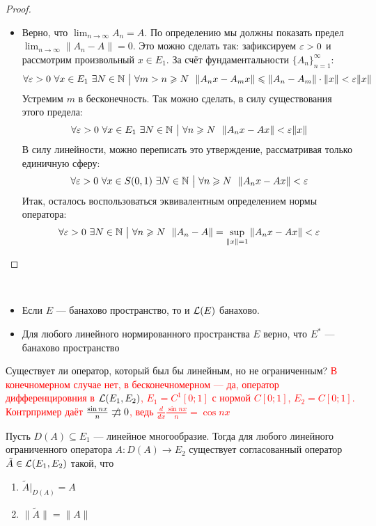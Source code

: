 \begin{proof}
\begin{enumerate}
\begin{itemize}
			\item Верно, что $\lim_{n \to \infty} A_n = A$. По определению мы должны показать предел \\ $\lim_{n \to \infty} \|A_n - A\| = 0$. Это можно сделать так: зафиксируем $\varepsilon > 0$ и рассмотрим произвольный $x \in E_1$. За счёт фундаментальности $\{A_n\}_{n = 1}^\infty$:
			\[
				\forall \eps > 0\ \forall x \in E_1\ \exists N \in \N \such \forall m > n \ge N\ \ \|A_nx - A_mx\| \le \|A_n - A_m\| \cdot \|x\| < \eps\|x\|
			\]
			Устремим $m$ в бесконечность. Так можно сделать, в силу существования этого предела:
			\[
				\forall \eps > 0\ \forall x \in E_1\ \exists N \in \N \such \forall n \ge N\ \ \|A_nx - Ax\| < \eps \|x\|
			\]
			В силу линейности, можно переписать это утверждение, рассматривая только единичную сферу:
			\[
				\forall \eps > 0\ \forall x \in S(0, 1)\ \exists N \in \N \such \forall n \ge N\ \ \|A_nx - Ax\| < \eps
			\]
			Итак, осталось воспользоваться эквивалентным определением нормы оператора:
			\[
				\forall \eps > 0\ \exists N \in \N \such \forall n \ge N\ \ \|A_n - A\| = \sup_{\|x\| = 1} \|A_nx - Ax\| < \eps
			\]
		\end{itemize}
	\end{enumerate}
\end{proof}

\begin{corollary}~
	\begin{itemize}
		\item Если $E$ --- банахово пространство, то и $\mathcal{L}(E)$ банахово.
		
		\item Для любого линейного нормированного пространства $E$ верно, что $E^*$ --- банахово пространство
	\end{itemize}
\end{corollary}

\begin{example}
	Существует ли оператор, который был бы линейным, но не ограниченным?
	\textcolor{red}{В конечномерном случае нет, в бесконечномерном --- да, оператор дифференцировния в $\mathcal{L}(E_1, E_2)$, $E_1 = C^1[0; 1]$ с нормой $C[0; 1]$, $E_2 = C[0; 1]$. Контрпример даёт $\frac{\sin nx}{n} \centernot\rra 0$, ведь $\frac{d}{dx} \frac{\sin nx}{n} = \cos nx$}
\end{example}

\begin{theorem} \label{long_theorem}
	Пусть $D(A) \subseteq E_1$ --- линейное многообразие. Тогда для любого линейного ограниченного оператора $A \colon D(A) \to E_2$ существует согласованный оператор $\tilde{A} \in \mathcal{L}(E_1, E_2)$ такой, что
	\begin{enumerate}
		\item $\tilde{A}|_{D(A)} = A$
		
		\item $\|\tilde{A}\| = \|A\|$
	\end{enumerate}
\end{theorem}

